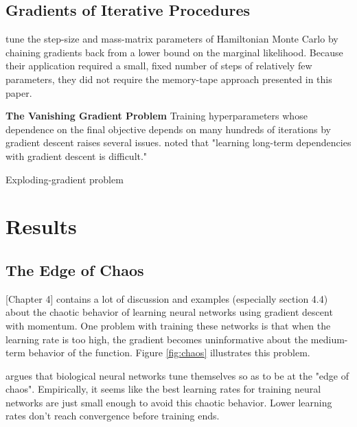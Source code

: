 \documentclass{article}
\begin{document}
\subsection{Gradients of Iterative Procedures}

\citet{Bridging14} tune the step-size and mass-matrix parameters of Hamiltonian Monte Carlo by chaining gradients back from a lower bound on the marginal likelihood.
Because their application required a small, fixed number of steps of relatively few parameters, they did not require the memory-tape approach presented in this paper.

\textbf{The Vanishing Gradient Problem}
Training hyperparameters whose dependence on the final objective depends on many hundreds of iterations by gradient descent raises several issues.
\citet{bengio1994learning} noted that "learning long-term dependencies with gradient descent is difficult."

Exploding-gradient problem~\cite{pascanu2012understanding}


\section{Results}

\subsection{The Edge of Chaos}

\cite{pearlmutter1996investigation}[Chapter 4] contains a lot of discussion and examples (especially section 4.4) about the chaotic behavior of learning neural networks using gradient descent with momentum.
One problem with training these networks is that when the learning rate is too high, the gradient becomes uninformative about the medium-term behavior of the function.
Figure \ref{fig:chaos} illustrates this problem.

\cite{pearlmutter2009sleep} argues that biological neural networks tune themselves so as to be at the "edge of chaos".
Empirically, it seems like the best learning rates for training neural networks are just small enough to avoid this chaotic behavior.
Lower learning rates don't reach convergence before training ends.
\end{document}
